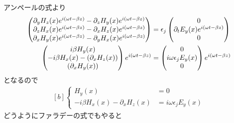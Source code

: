\documentclass[../ap_2013.tex]{subfiles}
\begin{document}
\section{}
アンペールの式より
\begin{equation}\begin{aligned}[b]
    \begin{pmatrix}
        \partial_y H_z(x)e^{i(\omega t-\beta z)} -\partial_z H_y(x)e^{i(\omega t-\beta z)}\\
        \partial_z H_x(x)e^{i(\omega t-\beta z)} -\partial_x H_z(x)e^{i(\omega t-\beta z)}\\
        \partial_x H_y(x)e^{i(\omega t-\beta z)} -\partial_y H_x(x)e^{i(\omega t-\beta z)}
    \end{pmatrix}
    &=\epsilon_j\begin{pmatrix}
        0\\
        \partial_t E_y(x)e^{i(\omega t-\beta z)}\\
        0
    \end{pmatrix}\\
    \begin{pmatrix}
        i\beta H_y(x)\\
        -i\beta H_x(x) -\qty(\partial_x H_z(x))\\
        \qty(\partial_x H_y(x))
    \end{pmatrix}e^{i(\omega t-\beta z)}
    &=\begin{pmatrix}
        0\\
        i\omega \epsilon_j E_y(x)\\
        0
    \end{pmatrix}e^{i(\omega t-\beta z)}
\end{aligned}\end{equation}
となるので
\begin{equation}\begin{aligned}[b]
    \begin{cases}
        H_y(x) &= 0\\
    -i\beta H_x(x) -\partial_x H_z(x) &= i\omega \epsilon_j E_y(x)
    \end{cases}
\end{aligned}\end{equation}
どうようにファラデーの式でもやると
\end{document}
